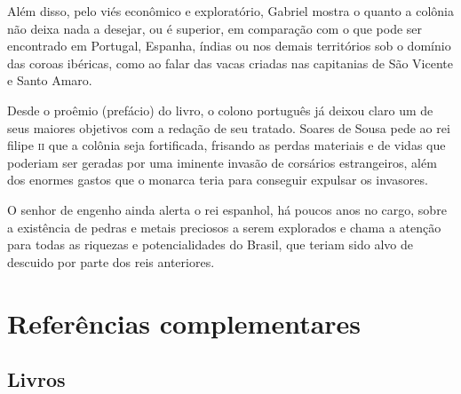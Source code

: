 \documentclass[12pt]{extarticle}
\begin{document}
Além disso, pelo viés econômico e exploratório, Gabriel mostra o quanto
a colônia não deixa nada a desejar, ou é superior, em comparação com o
que pode ser encontrado em Portugal, Espanha, índias ou nos demais
territórios sob o domínio das coroas ibéricas, como ao falar das vacas
criadas nas capitanias de São Vicente e Santo Amaro.

Desde o proêmio (prefácio) do livro, o colono português já deixou claro
um de seus maiores objetivos com a redação de seu tratado.
Soares de Sousa pede ao rei filipe \textsc{ii} que a colônia seja fortificada,
frisando as perdas materiais e de vidas que poderiam ser geradas por uma
iminente invasão de corsários estrangeiros, além dos enormes gastos que
o monarca teria para conseguir expulsar os invasores.

O senhor de engenho ainda alerta o rei espanhol, há poucos anos no
cargo, sobre a existência de pedras e metais preciosos a serem
explorados e chama a atenção para todas as riquezas e potencialidades do
Brasil, que teriam sido alvo de descuido por parte dos reis anteriores.


\section{Referências complementares}

\subsection{Livros}
\end{document}
